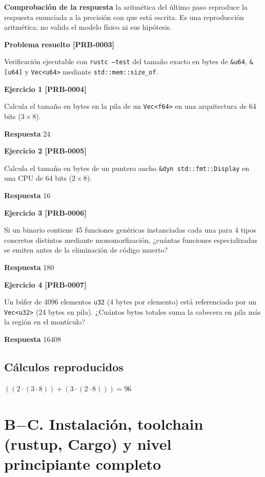 \documentclass{book}
\begin{document}
\noindent\textbf{Comprobación de la respuesta} la aritmética del último paso reproduce la respuesta enunciada a la precisión con que está escrita. Es una reproducción aritmética; no valida el modelo físico ni sus hipótesis.

\noindent\textbf{Problema resuelto [PRB-0003]}

Verificación ejecutable con \texttt{rustc --test} del tamaño exacto en bytes de \texttt{\&u64}, \texttt{\&[u64]} y \texttt{Vec<u64>} mediante \texttt{std::mem::size\_of}.

\noindent\textbf{Ejercicio 1 [PRB-0004]}

Calcula el tamaño en bytes en la pila de un \texttt{Vec<f64>} en una arquitectura de 64 bits (\(3 \times 8\)).

\noindent\textbf{Respuesta} 24

\noindent\textbf{Ejercicio 2 [PRB-0005]}

Calcula el tamaño en bytes de un puntero ancho \texttt{\&dyn std::fmt::Display} en una CPU de 64 bits (\(2 \times 8\)).

\noindent\textbf{Respuesta} 16

\noindent\textbf{Ejercicio 3 [PRB-0006]}

Si un binario contiene 45 funciones genéricas instanciadas cada una para 4 tipos concretos distintos mediante monomorfización, ¿cuántas funciones especializadas se emiten antes de la eliminación de código muerto?

\noindent\textbf{Respuesta} 180

\noindent\textbf{Ejercicio 4 [PRB-0007]}

Un búfer de 4096 elementos \texttt{u32} (4 bytes por elemento) está referenciado por un \texttt{Vec<u32>} (24 bytes en pila). ¿Cuántos bytes totales suma la cabecera en pila más la región en el montículo?

\noindent\textbf{Respuesta} 16408

\subsection*{Cálculos reproducidos}

\(\left(\left(2\cdot \left(3\cdot 8\right)\right)+\left(3\cdot \left(2\cdot 8\right)\right)\right) = 96\)

\section{B\(-\)C. Instalación, toolchain (rustup, Cargo) y nivel principiante completo}
\end{document}
